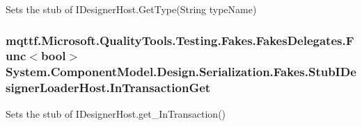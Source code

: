 Sets the stub of I\-Designer\-Host.\-Get\-Type(\-String type\-Name)

\hypertarget{class_system_1_1_component_model_1_1_design_1_1_serialization_1_1_fakes_1_1_stub_i_designer_loader_host_a646ee3226f2f066eeb24098982513d90}{
\subsubsection[{In\-Transaction\-Get}]{\setlength{\rightskip}{0pt plus 5cm}mqttf.\-Microsoft.\-Quality\-Tools.\-Testing.\-Fakes.\-Fakes\-Delegates.\-Func$<$bool$>$ System.\-Component\-Model.\-Design.\-Serialization.\-Fakes.\-Stub\-I\-Designer\-Loader\-Host.\-In\-Transaction\-Get}}\label{class_system_1_1_component_model_1_1_design_1_1_serialization_1_1_fakes_1_1_stub_i_designer_loader_host_a646ee3226f2f066eeb24098982513d90}


Sets the stub of I\-Designer\-Host.\-get\-\_\-\-In\-Transaction()

